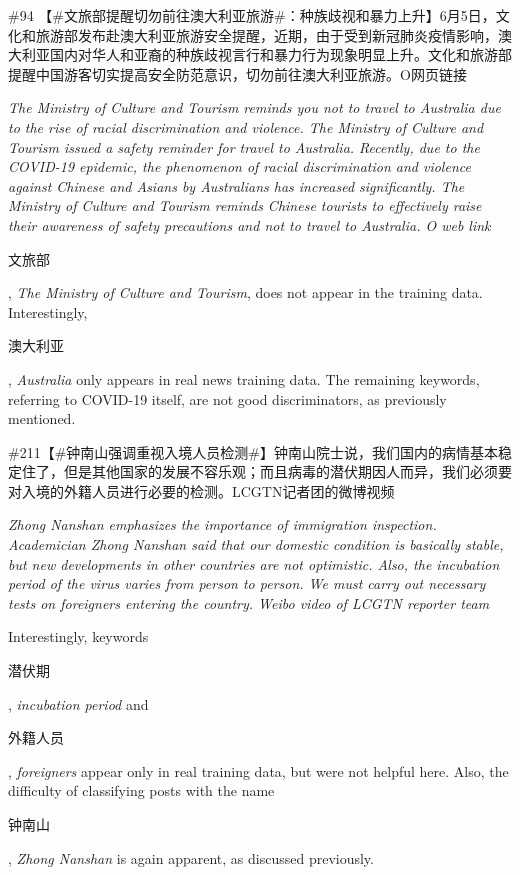 \documentclass [11pt, proquest] {uwthesis}[2020/02/24]
\begin{document}
\begin{CJK*}{UTF8}{gbsn}\#94 【\#文旅部提醒切勿前往澳大利亚旅游\#：种族歧视和暴力上升】6月5日，文化和旅游部发布赴澳大利亚旅游安全提醒，近期，由于受到新冠肺炎疫情影响，澳大利亚国内对华人和亚裔的种族歧视言行和暴力行为现象明显上升。文化和旅游部提醒中国游客切实提高安全防范意识，切勿前往澳大利亚旅游。O网页链接\end{CJK*}

\textit{The Ministry of Culture and Tourism reminds you not to travel to Australia due to the rise of racial discrimination and violence. The Ministry of Culture and Tourism issued a safety reminder for travel to Australia. Recently, due to the COVID-19 epidemic, the phenomenon of racial discrimination and violence against Chinese and Asians by Australians has increased significantly. The Ministry of Culture and Tourism reminds Chinese tourists to effectively raise their awareness of safety precautions and not to travel to Australia. O web link}

\begin{CJK*}{UTF8}{gbsn}文旅部\end{CJK*}, \textit{The Ministry of Culture and Tourism}, does not appear in the training data. Interestingly, \begin{CJK*}{UTF8}{gbsn}澳大利亚\end{CJK*}, \textit{Australia} only appears in real news training data. The remaining keywords, referring to COVID-19 itself, are not good discriminators, as previously mentioned.

\begin{CJK*}{UTF8}{gbsn}\#211【\#钟南山强调重视入境人员检测\#】钟南山院士说，我们国内的病情基本稳定住了，但是其他国家的发展不容乐观；而且病毒的潜伏期因人而异，我们必须要对入境的外籍人员进行必要的检测。LCGTN记者团的微博视频\end{CJK*}

\textit{Zhong Nanshan emphasizes the importance of immigration inspection. Academician Zhong Nanshan said that our domestic condition is basically stable, but new developments in other countries are not optimistic. Also, the incubation period of the virus varies from person to person. We must carry out necessary tests on foreigners entering the country. Weibo video of LCGTN reporter team}

Interestingly, keywords \begin{CJK*}{UTF8}{gbsn}潜伏期\end{CJK*}, \textit{incubation period} and \begin{CJK*}{UTF8}{gbsn}外籍人员\end{CJK*}, \textit{foreigners} appear only in real training data, but were not helpful here. Also, the difficulty of classifying posts with the name \begin{CJK*}{UTF8}{gbsn}钟南山\end{CJK*}, \textit{Zhong Nanshan} is again apparent, as discussed previously.
\end{document}
